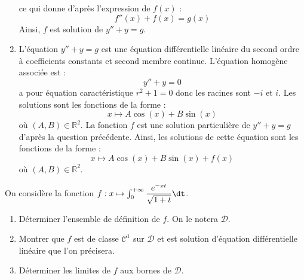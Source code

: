 \documentclass[a4paper,10pt]{report}
\begin{document}
\begin{enumerate}
ce qui donne d'après l'expression de $f(x)$ :
$$ f''(x)+f(x) = g(x)$$
Ainsi, $f$ est solution de $y''+y=g$.
\item L'équation $y''+y=g$ est une équation différentielle linéaire du second ordre à coefficients constants et second membre continue. L'équation homogène associée est :
$$ y''+y=0$$
a pour équation caractéristique $r^2+1=0$ donc les racines sont $-i$ et $i$. Les solutions sont les fonctions de la forme :
$$ x \mapsto A \cos(x) + B \sin(x)$$
où $(A,B) \in \mathbb{R}^2$. La fonction $f$ est une solution particulière de $y''+y=g$ d'après la question précédente. Ainsi, les solutions de cette équation sont les fonctions de la forme :
$$ x \mapsto A \cos(x) + B \sin(x) + f(x)$$
où $(A,B) \in \mathbb{R}^2$.
\end{enumerate}

\begin{Exa} On considère la fonction $f : x \mapsto \int_0^{+ \infty} \dfrac{e^{-xt}}{\sqrt{1+t}} \dt$.
\begin{enumerate}
\item Déterminer l'ensemble de définition de $f$. On le notera $\mathcal{D}$.
\item Montrer que $f$ est de classe $\mathcal{C}^1$ sur $\mathcal{D}$ et est solution d'équation différentielle linéaire que l'on précisera.
\item Déterminer les limites de $f$ aux bornes de $\mathcal{D}$.
\end{enumerate}
\end{Exa}

\corr 
\end{document}

